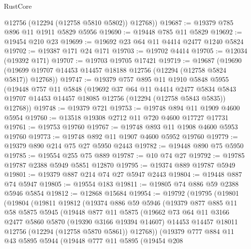 \begin{lexlean}{RustCore}
\begin{coremodule}
        @12756
        (@12294 (@12758 @5810 @5802))
        @12768))
@19687 := @19379 @785 @896 @11 @1911 @5829 @5956
@19690 := @19448 @785 @11 @5829
@19692 := @19454 @210 @23
@19699 := @19692 @23 @64 @11 @4414 @2477 @1240 @5824
@19702 := @19387 @171 @24 @171
@19703 := @19702 @4414
@19705 := @12034 (@19392 @171)
@19707 := @19703 @19705 @17421
@19719 := @19687
    (@19690 (@19699 @19707 @14453 @14457 @18188 @12756 (@12294 (@12758 @5824 @5817)) @12768))
@19747 := @19379
    @757
    @895
    @11
    @1910
    @5848
    @5955
    (@19448
      @757
      @11
      @5848
      (@19692
        @37
        @64
        @11
        @4414
        @2477
        @5834
        @5843
        @19707
        @14453
        @14457
        @18085
        @12756
        (@12294 (@12758 @5843 @5835))
        @12768))
@19748 := @19379 @721
@19753 := @19748 @894 @11 @1909 @4600 @5954
@19760 := @13518 @19308 @2712 @11 @720 @4600 @17727 @17731
@19761 := @19753 @19760
@19767 := @19748 @893 @11 @1908 @4600 @5953 @19760
@19773 := @19748 @892 @11 @1907 @4600 @5952 @19760
@19779 := @19379 @890 @214 @75 @27 @5950 @2443
@19782 := @19448 @890 @75 @5950
@19785 := @19554 @255 @75 @889
@19787 := @10 @74 @27
@19792 := @19785 @19787 @2388 @5949 @5851 @12870
@19795 := @19374 @889 @19787 @5949
@19801 := @19379 @887 @214 @74 @27 @5947 @2443
@19804 := @19448 @887 @74 @5947
@19805 := @19554 @183
@19811 := @19805 @74 @886 @59 @2388 @5946 @5854
@19812 := @12868 @15684
@19954 := @19792
    (@19795
      (@19801
        (@19804
          (@19811
            @19812
            (@19374
              @886
              @59
              @5946
              (@19379
                @877
                @885
                @11
                @58
                @5875
                @5945
                (@19448
                  @877
                  @11
                  @5875
                  (@19662
                    @73
                    @64
                    @11
                    @3166
                    @2477
                    @5860
                    @5870
                    (@19390 @3166 @19394 @14607)
                    @14453
                    @14457
                    @18011
                    @12756
                    (@12294 (@12758 @5870 @5861))
                    @12768))
                (@19379
                  @777
                  @884
                  @11
                  @43
                  @5895
                  @5944
                  (@19448
                    @777
                    @11
                    @5895
                    (@19454
                      @208

\end{coremodule}
\end{lexlean}
